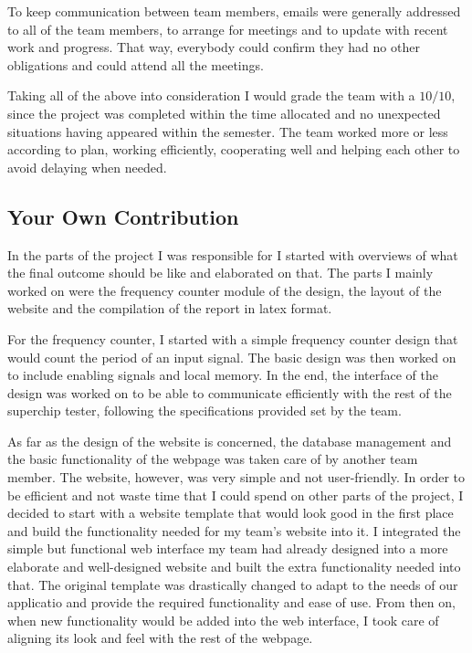 To keep communication between team members, emails were generally addressed to all of the team members, to arrange for meetings and to update with recent work and progress. That way, everybody could confirm they had no other obligations and could attend all the meetings.

Taking all of the above into consideration I would grade the team with a $10/10$, since the project was completed within the time allocated and no unexpected situations having appeared within the semester. The team worked more or less according to plan, working efficiently, cooperating well and helping each other to avoid delaying when needed.


\subsection{Your Own Contribution}
\label{sec:own_contribution}

%

In the parts of the project I was responsible for I started with overviews of what the final outcome should be like and elaborated on that. The parts I mainly worked on were the frequency counter module of the design, the layout of the website and the compilation of the report in latex format.

For the frequency counter, I started with a simple frequency counter design that would count the period of an input signal. The basic design was then worked on to include enabling signals and local memory. In the end, the interface of the design was worked on to be able to communicate efficiently with the rest of the superchip tester, following the specifications provided set by the team.

As far as the design of the website is concerned, the database management and the basic functionality of the webpage was taken care of by another team member. The website, however, was very simple and not user-friendly. In order to be efficient and not waste time that I could spend on other parts of the project, I decided to start with a website template that would look good in the first place and build the functionality needed for my team's website into it. I integrated the simple but functional web interface my team had already designed into a more elaborate and well-designed website and built the extra functionality needed into that. The original template was drastically changed to adapt to the needs of our applicatio and provide the required functionality and ease of use. From then on, when new functionality would be added into the web interface, I took care of aligning its look and feel with the rest of the webpage.

